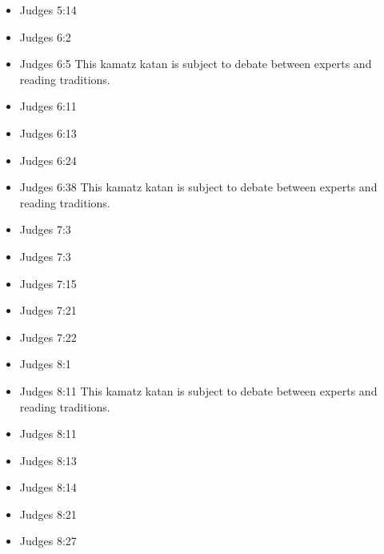 \documentclass[14pt]{book}
\begin{document}
\begin{multicols}{2}
\begin{itemize}
			\item Judges 5:14
			
			\item Judges 6:2
			
			\item Judges 6:5 This kamatz katan is subject to debate between experts and reading traditions.
			
			\item Judges 6:11
			
			\item Judges 6:13
			
			\item Judges 6:24
			
			\item Judges 6:38 This kamatz katan is subject to debate between experts and reading traditions.
			
			\item Judges 7:3
			
			\item Judges 7:3
			
			\item Judges 7:15
			
			\item Judges 7:21
			
			\item Judges 7:22
			
			\item Judges 8:1
			
			\item Judges 8:11 This kamatz katan is subject to debate between experts and reading traditions.
			
			\item Judges 8:11
			
			\item Judges 8:13
			
			\item Judges 8:14
			
			\item Judges 8:21
			
			\item Judges 8:27
			

\end{itemize}
\end{multicols}
\end{document}
